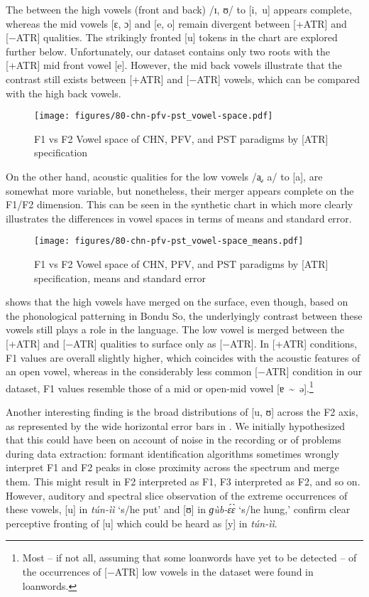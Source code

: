 \documentclass[output=paper,colorlinks,citecolor=brown]{langscibook}
\begin{document}
The  between the high vowels (front and back) /ɪ, ʊ/ to [i,~u] appears complete, whereas the mid vowels [ɛ, ɔ] and [e, o] remain divergent between [+ATR] and [−ATR] qualities. The strikingly fronted [u] tokens in the chart are explored further below. Unfortunately, our dataset contains only two roots with the [+ATR] mid front vowel [e]. However, the mid back vowels illustrate that the contrast still exists between [+ATR] and [−ATR] vowels, which can be compared with the high back vowels. 

\begin{figure}
    \centering
    \texttt{[image: figures/80-chn-pfv-pst\_vowel-space.pdf]}
    \caption{F1 vs F2 Vowel space of CHN, PFV, and PST paradigms by [ATR] specification}
    \label{fig:vowel-space}
\end{figure}

On the other hand, acoustic qualities for the low vowels /a̘, a/ to [a], are somewhat more variable, but nonetheless, their merger appears complete on the F1/F2 dimension. This can be seen in the synthetic chart in  which more clearly illustrates the differences in vowel spaces in terms of means and standard error.

\begin{figure}
    \centering
    \texttt{[image: figures/80-chn-pfv-pst\_vowel-space\_means.pdf]}
    \caption{F1 vs F2 Vowel space of CHN, PFV, and PST paradigms by [ATR] specification, means and standard error}
    \label{fig:vowel-space-means}
\end{figure}

 shows that the high vowels have merged on the surface, even though, based on the phonological patterning in Bondu So, the  underlyingly contrast between these vowels still plays a role in the language. The low vowel is merged between the [+ATR] and [−ATR] qualities to surface only as [−ATR]. In [+ATR] conditions, F1 values are overall slightly higher, which coincides with the acoustic features of an open vowel, whereas in the considerably less common [−ATR] condition in our dataset, F1 values resemble those of a mid or open-mid vowel [ɐ~{\sim}~ə].\footnote{Most -- if not all, assuming that some loanwords have yet to be detected -- of the occurrences of [−ATR] low vowels in the dataset were found in loanwords.} 

Another interesting finding is the broad distributions of [u, ʊ] across the F2 axis, as represented by the wide horizontal error bars in . We initially hypothesized that this could have been on account of noise in the recording or of problems during data extraction: formant identification algorithms sometimes wrongly interpret F1 and F2 peaks in close proximity across the spectrum and merge them. This might result in F2 interpreted as F1, F3 interpreted as F2, and so on. However, auditory and spectral slice observation of the extreme occurrences of these vowels, [u] in \textit{tún-ìì} `s/he put' and [ʊ] in \textit{ɡùb-ɛ́ɛ̀} `s/he hung,' confirm clear perceptive fronting of [u] which could be heard as [y] in \textit{tún-ìì}. 
\end{document}
